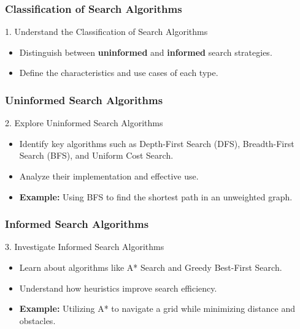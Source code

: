 \documentclass[aspectratio=169]{beamer}
\begin{document}
\begin{frame}[fragile]
    \frametitle{Classification of Search Algorithms}
    \begin{block}{1. Understand the Classification of Search Algorithms}
        \begin{itemize}
            \item Distinguish between \textbf{uninformed} and \textbf{informed} search strategies.
            \item Define the characteristics and use cases of each type.
        \end{itemize}
    \end{block}
\end{frame}

\begin{frame}[fragile]
    \frametitle{Uninformed Search Algorithms}
    \begin{block}{2. Explore Uninformed Search Algorithms}
        \begin{itemize}
            \item Identify key algorithms such as Depth-First Search (DFS), Breadth-First Search (BFS), and Uniform Cost Search.
            \item Analyze their implementation and effective use.
            \item \textbf{Example:} Using BFS to find the shortest path in an unweighted graph.
        \end{itemize}
    \end{block}
\end{frame}

\begin{frame}[fragile]
    \frametitle{Informed Search Algorithms}
    \begin{block}{3. Investigate Informed Search Algorithms}
        \begin{itemize}
            \item Learn about algorithms like A* Search and Greedy Best-First Search.
            \item Understand how heuristics improve search efficiency.
            \item \textbf{Example:} Utilizing A* to navigate a grid while minimizing distance and obstacles.
        \end{itemize}
    \end{block}
\end{frame}
\end{document}
